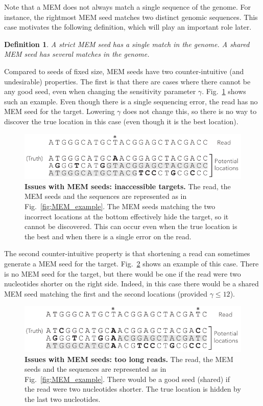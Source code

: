 \documentclass{article}
\newtheorem{definition}{Definition}
\begin{document}
Note that a MEM does not always match a single sequence of the genome. For
instance, the rightmost MEM seed matches two distinct genomic sequences.
This case motivates the following definition, which will play an important
role later.

\begin{definition}
A \emph{strict} MEM seed has a single match in the genome.
A \emph{shared} MEM seed has several matches in the genome.
\end{definition}

Compared to seeds of fixed size, MEM seeds have two counter-intuitive (and
undesirable) properties. The first is that there are cases where there
cannot be any good seed, even when changing the sensitivity parameter
$\gamma$. Fig.~\ref{fig:full_masking_example} shows such an example. Even
though there is a single sequencing error, the read has no MEM seed for
the target. Lowering $\gamma$ does not change this, so there is no way to
discover the true location in this case (even though it is the best
location).

\begin{figure}[h]
\centering
\includegraphics[scale=1]{full_masking_example.pdf}
\caption{\textbf{Issues with MEM seeds: inaccessible targets.}
The read, the MEM seeds and the sequences are represented as in
Fig.~\ref{fig:MEM_example}. The MEM seeds matching the two incorrect
locations at the bottom effectively hide the target, so it cannot
be discovered. This can occur even when the true location is the
best and when there is a single error on the read.}
\label{fig:full_masking_example}
\end{figure}

The second counter-intuitive property is that shortening a read can
sometimes generate a MEM seed for the target. Fig.~\ref{fig:short_vs_long}
shows an example of this case. There is no MEM seed for the target, but
there would be one if the read were two nucleotides shorter on the right
side. Indeed, in this case there would be a shared MEM seed matching the
first and the second locations (provided $\gamma \leq 12$).


\begin{figure}[h]
\centering
\includegraphics[scale=1]{short_vs_long_example.pdf}
\caption{\textbf{Issues with MEM seeds: too long reads.}
The read, the MEM seeds and the sequences are represented as in
Fig.~\ref{fig:MEM_example}. There would be a good seed (shared) if the
read were two nucleotides shorter. The true location is hidden by
the last two nucleotides.}
\label{fig:short_vs_long}
\end{figure}
\end{document}
